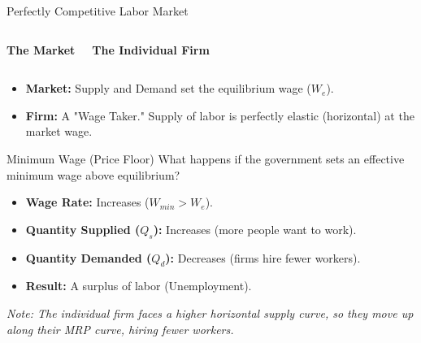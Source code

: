 \documentclass[aspectratio=169]{beamer}
\begin{document}
\begin{frame}{Perfectly Competitive Labor Market}
    \begin{columns}
        \centering
        \textbf{The Market} \\
        
        \centering
        \textbf{The Individual Firm} \\
    \end{columns}
    
    \vspace{0.5cm}
    \begin{itemize}
        \item \textbf{Market:} Supply and Demand set the equilibrium wage ($W_e$).
        \item \textbf{Firm:} A "Wage Taker." Supply of labor is perfectly elastic (horizontal) at the market wage.
    \end{itemize}
\end{frame}

\begin{frame}{Minimum Wage (Price Floor)}
    What happens if the government sets an effective minimum wage above equilibrium?
    
    \vspace{0.3cm}
    \begin{itemize}
        \item \textbf{Wage Rate:} Increases ($W_{min} > W_e$).
        \item \textbf{Quantity Supplied ($Q_s$):} Increases (more people want to work).
        \item \textbf{Quantity Demanded ($Q_d$):} Decreases (firms hire fewer workers).
        \item \textbf{Result:} A surplus of labor (Unemployment).
    \end{itemize}
    
    \textit{Note: The individual firm faces a higher horizontal supply curve, so they move up along their MRP curve, hiring fewer workers.}
\end{frame}
\end{document}
